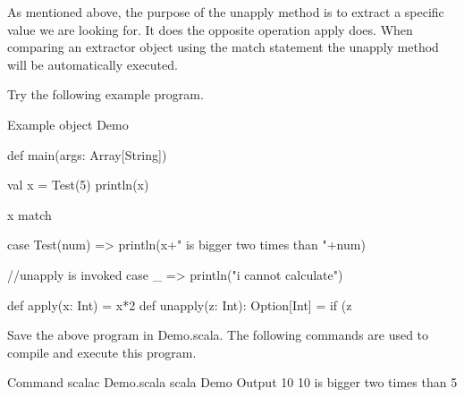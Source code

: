 As mentioned above, the purpose of the unapply method is to extract a specific value we are looking for. It does the opposite operation apply does. When comparing an extractor object using the match statement the unapply method will be automatically executed.

Try the following example program.

Example
object Demo {
   def main(args: Array[String]) {
      val x = Test(5)
      println(x)

      x match {
         case Test(num) => println(x+" is bigger two times than "+num)
         
         //unapply is invoked
         case _ => println("i cannot calculate")
      }
   }
   def apply(x: Int) = x*2
   def unapply(z: Int): Option[Int] = if (z%
}
Save the above program in Demo.scala. The following commands are used to compile and execute this program.

Command
\>scalac Demo.scala
\>scala Demo
Output
10
10 is bigger two times than 5
